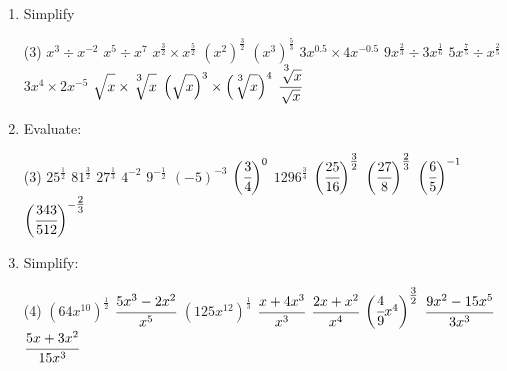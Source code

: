 \documentclass[fleqn, twoside]{article}
\begin{document}
\exercise{}
\begin{enumerate}
    \item Simplify
        \begin{tasks}(3) %
            \task $x^3 \div x^{-2}$
            \task $x^5 \div x^7$
            \task $x^{\textstyle\frac{3}{2}} \times x^{\textstyle\frac{5}{2}}$
            \task $(x^2)^{\textstyle\frac{3}{2}}$
            \task $(x^3)^{\textstyle\frac{5}{3}}$
            \task $3x^{0.5} \times 4x^{-0.5}$
            \task $9x^{\textstyle\frac{2}{3}} \div 3x^{\textstyle\frac{1}{6}}$
            \task $5x^{\textstyle\frac{7}{5}} \div x^{\textstyle\frac{2}{5}}$
            \task $3x^4 \times 2x^{-5}$
            \task $\sqrt{\strut x} \times \sqrt[\textstyle{^3}]{\strut x}$
            \task $\Big(\sqrt{\strut x}\Big)^3 \times \Big(\sqrt[\textstyle{^3}]{\strut x}\Big)^4$
            \task $\cfrac{\sqrt[\textstyle{^3}]{ x}}{\sqrt{x}}$
        \end{tasks}
        
    \item Evaluate:
        \begin{tasks}(3)%
            \task $25^{\textstyle\frac{1}{2}}$
            \task $81^{\textstyle\frac{3}{2}}$
            \task $27^{\textstyle\frac{1}{3}}$
            \task $4^{-2}$
            \task $9^{-\textstyle\frac{1}{2}}$
            \task $(-5)^{-3}$
            \task $\bigg(\cfrac{3}{4}\bigg)^0$
            \task $1296^{\textstyle\frac{3}{4}}$
            \task $\bigg(\cfrac{25}{16}\bigg)^{\textstyle\frac{3}{2}}$
            \task $\bigg(\cfrac{27}{8}\bigg)^{\textstyle\frac{2}{3}}$
            \task $\bigg(\cfrac{6}{5}\bigg)^{-1}$
            \task $\bigg(\cfrac{343}{512}\bigg)^{-\textstyle\frac{2}{3}}$
        \end{tasks}
        \newpage
        
    \item Simplify:
        \vspace{-2mm}
        \begin{tasks}(4) %
            \task $(64x^{10})^{\textstyle\frac{1}{2}}$
            \task $\cfrac{5x^3-2x^2}{x^5}$
            \task $(125x^{12})^{\textstyle\frac{1}{3}}$
            \task $\cfrac{x+4x^3}{x^3}$
            \task $\cfrac{2x+x^2}{x^4}$
            \task $\bigg(\cfrac{4}{9}x^4\bigg)^{\textstyle\frac{3}{2}}$
            \task $\cfrac{9x^2-15x^5}{3x^3}$
            \task $\cfrac{5x+3x^2}{15x^3}$
        \end{tasks}
        

\end{enumerate}
\end{document}
